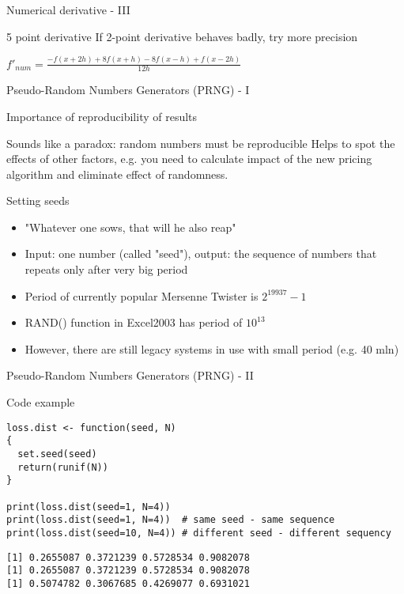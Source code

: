 \documentclass[presentation]{beamer}
\begin{document}
\begin{frame}[label=sec-2-3]{Numerical derivative - III}
\begin{block}{5 point derivative}
If 2-point derivative behaves badly, try more precision

$f'_{num} = \frac{-f(x+2h) + 8f(x+h) - 8f(x-h) + f(x-2h)}{12h}$
\end{block}
\end{frame}
\begin{frame}[label=sec-2-4]{Pseudo-Random Numbers Generators (PRNG) - I}
\begin{block}{Importance of reproducibility of results}
\begin{block}{Sounds like a paradox: random numbers must be reproducible}
Helps to spot the effects of other factors, e.g. you need to calculate impact of the new pricing algorithm and eliminate effect of randomness.
\end{block}
\end{block}
\begin{block}{Setting seeds}
\begin{itemize}
\item "Whatever one sows, that will he also reap"
\item Input: one number (called "seed"), output: the sequence of numbers that repeats only after very big period
\item Period of currently popular Mersenne Twister is $2^{19937} - 1$
\item RAND() function in Excel2003 has period of $10^{13}$
\item However, there are still legacy systems in use with small period (e.g. 40 mln)
\end{itemize}
\end{block}
\end{frame}
\begin{frame}[fragile,label=sec-2-5]{Pseudo-Random Numbers Generators (PRNG) - II}
 \begin{block}{Code example}
\begin{verbatim}
loss.dist <- function(seed, N)
{
  set.seed(seed)
  return(runif(N))
}

print(loss.dist(seed=1, N=4))
print(loss.dist(seed=1, N=4))  # same seed - same sequence
print(loss.dist(seed=10, N=4)) # different seed - different sequency
\end{verbatim}

\begin{verbatim}
[1] 0.2655087 0.3721239 0.5728534 0.9082078
[1] 0.2655087 0.3721239 0.5728534 0.9082078
[1] 0.5074782 0.3067685 0.4269077 0.6931021
\end{verbatim}
\end{block}
\end{frame}
\end{document}
